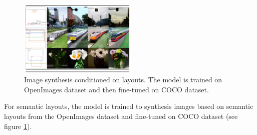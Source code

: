 \begin{figure}
    \centering
    \includegraphics[width=0.5\textwidth]{images/diffusion_models/stable_diffusion/experiments_3.png}
    \caption{Image synthesis conditioned on layouts. The model is trained on OpenImages dataset and then fine-tuned on COCO dataset.}
    \label{fig:stable_diffusion_experiments_semantic_layouts}
\end{figure}

For semantic layouts, the model is trained to synthesis images based on semantic layouts from the OpenImages dataset and fine-tuned on COCO dataset (see figure \ref{fig:stable_diffusion_experiments_semantic_layouts}).




